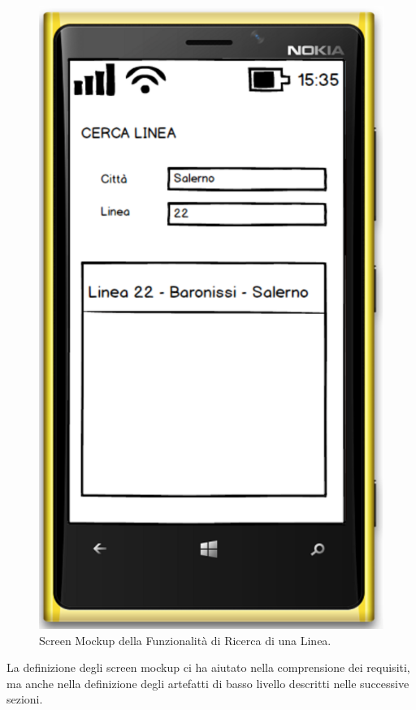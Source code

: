 \begin{figure}[tb]
\centering
\includegraphics[scale=.3]{img/ui.png}
\caption{Screen Mockup della Funzionalit\`{a} di Ricerca di una Linea.}
\label{fig:ui}
\end{figure} 

La definizione degli screen mockup ci ha aiutato nella comprensione dei requisiti, ma anche nella definizione degli artefatti di basso livello descritti nelle successive sezioni. 


